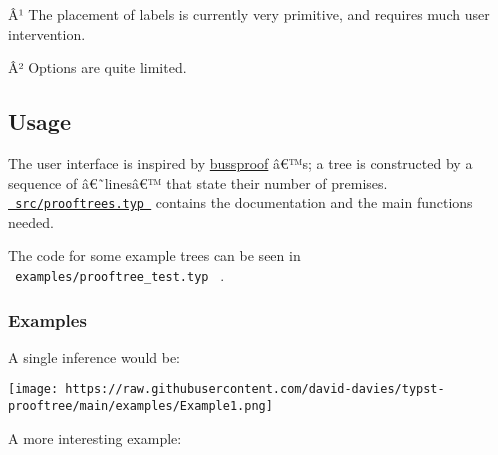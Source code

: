 Â¹ The placement of labels is currently very primitive, and requires
much user intervention.

Â² Options are quite limited.

\subsection{Usage}\label{usage}

The user interface is inspired by
\href{https://ctan.org/pkg/bussproofs}{bussproof} â€™s; a tree is
constructed by a sequence of â€˜linesâ€™ that state their number of
premises.
\href{https://github.com/typst/packages/raw/main/packages/preview/prooftrees/0.1.0/src/prooftrees.typ}{\texttt{\ src/prooftrees.typ\ }}
contains the documentation and the main functions needed.

The code for some example trees can be seen in
\texttt{\ examples/prooftree\_test.typ\ } .

\subsubsection{Examples}\label{examples}

A single inference would be:

\begin{Shaded}
\begin{Highlighting}[]

\NormalTok{)}
\end{Highlighting}
\end{Shaded}

\texttt{[image: https://raw.githubusercontent.com/david-davies/typst-prooftree/main/examples/Example1.png]}

A more interesting example:

\begin{Shaded}
\begin{Highlighting}[]

\NormalTok{)}
\end{Highlighting}
\end{Shaded}

